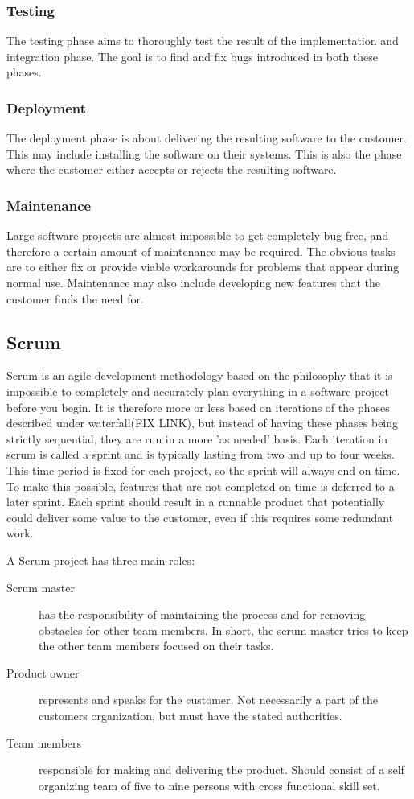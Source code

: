 \subsubsection{Testing}
The testing phase aims to thoroughly test the result of the implementation and
integration phase. The goal is to find and fix bugs introduced in both these
phases.

\subsubsection{Deployment}
The deployment phase is about delivering the resulting software to the
customer. This may include installing the software on their systems. This is
also the phase where the customer either accepts or rejects the resulting
software.

\subsubsection{Maintenance}
Large software projects are almost impossible to get completely bug free, and
therefore a certain amount of maintenance may be required. The obvious tasks
are to either fix or provide viable workarounds for problems that appear during
normal use. Maintenance may also include developing new features that the
customer finds the need for.

\subsection{Scrum}
Scrum is an agile development methodology based on the philosophy that it is
impossible to completely and accurately plan everything in a software project
before you begin. It is therefore more or less based on iterations of the
phases described under waterfall(FIX LINK), but instead of having these phases
being strictly sequential, they are run in a more 'as needed' basis. Each
iteration in scrum is called a sprint and is typically lasting from two and up
to four weeks. This time period is fixed for each project, so the sprint will
always end on time. To make this possible, features that are not completed on
time is deferred to a later sprint. Each sprint should result in a runnable
product that potentially could deliver some value to the customer, even if this
requires some redundant work.

\noindent A Scrum project has three main roles:
\begin{description}
	\item[Scrum master] has the responsibility of maintaining the process and
		for removing obstacles for other team members. In short, the scrum
		master tries to keep the other team members focused on their tasks.
	\item[Product owner] represents and speaks for the customer. Not
		necessarily a part of the customers organization, but must have the
		stated authorities.
	\item[Team members] responsible for making and delivering the product.
		Should consist of a self organizing team of five to nine persons with
		cross functional skill set.
\end{description}

